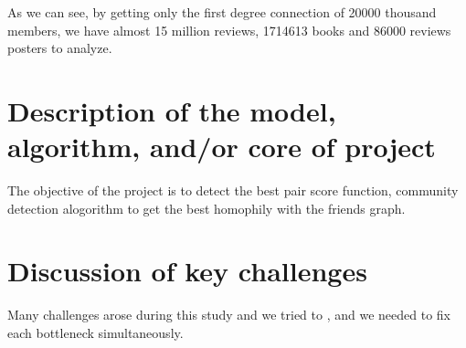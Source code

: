 \documentclass[11pt]{article}
\begin{document}

As we can see, by getting only the first degree connection of 20000 thousand members, we have almost 15 million reviews, 1714613 books and 86000 reviews posters to analyze.













\section{Description of the model, algorithm, and/or core of project}

The objective of the project is to detect the best pair score function, community detection alogorithm to get the best homophily with the friends graph.


\section{Discussion of key challenges}

Many challenges arose during this study and we tried to , and we needed to fix each bottleneck simultaneously.
\end{document}
